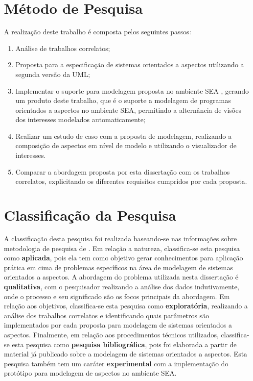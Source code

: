 \section{Método de Pesquisa}

A realização deste trabalho é composta pelos seguintes passos:

\begin{enumerate}
  \item Análise de trabalhos correlatos;
  \item Proposta para a especificação de sistemas orientados a aspectos utilizando a segunda versão da UML;
  \item Implementar o suporte para modelagem proposta no ambiente SEA \cite{silva:00}, gerando um produto deste trabalho, que é o suporte a
  modelagem de programas orientados a aspectos no ambiente SEA, permitindo a alternância de visões dos interesses modelados automaticamente;
  \item Realizar um estudo de caso com a proposta de modelagem, realizando a composição de aspectos em nível de modelo e utilizando o visualizador de
  interesses.
  \item Comparar a abordagem proposta por esta dissertação com os trabalhos correlatos, explicitando os diferentes requisitos cumpridos por cada
  proposta.
\end{enumerate}

\section{Classificação da Pesquisa}

A classificação desta pesquisa foi realizada baseando-se nas informações sobre metodologia de pesquisa de \cite{silva-menezes:01}. Em relação a
natureza, classifica-se esta pesquisa como \textbf{aplicada}, pois ela tem como objetivo gerar conhecimentos para aplicação prática em cima de
problemas específicos na área de modelagem de sistemas orientados a aspectos. A abordagem do problema utilizada nesta dissertação é
\textbf{qualitativa}, com o pesquisador realizando a análise dos dados indutivamente, onde o processo e seu significado são os
focos principais da abordagem. Em relação aos objetivos, classifica-se esta pesquisa como \textbf{exploratória}, realizando a análise dos trabalhos
correlatos e identificando quais parâmetros são implementados por cada proposta para modelagem de sistemas orientados a aspectos. Finalmente, em
relação aos procedimentos técnicos utilizados, classifica-se esta pesquisa como \textbf{pesquisa bibliográfica}, pois foi elaborada a partir de
material já publicado sobre a modelagem de sistemas orientados a aspectos. Esta pesquisa também tem um caráter \textbf{experimental} com a
implementação do protótipo para modelagem de aspectos no ambiente SEA.

